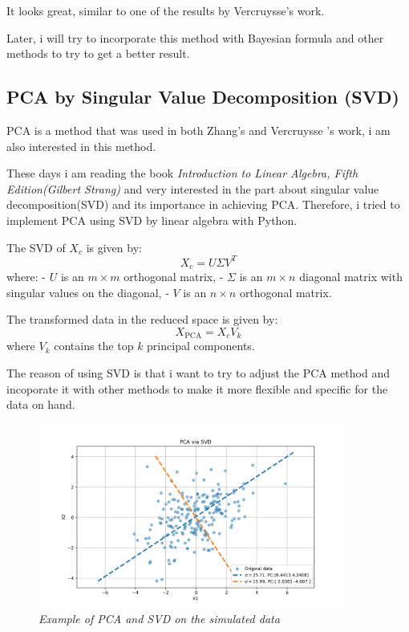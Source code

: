 \documentclass{article}
\begin{document}
It looks great, similar to one of the results by Vercruysse's work.

Later, i will try to incorporate this method with Bayesian formula and other methods to try to get a better result.


\subsection{PCA by Singular Value Decomposition (SVD)}

PCA is a method that was used in both Zhang's and Vercruysse 's work, i am also interested in this method.

These days i am reading the book \textit{Introduction to Linear Algebra, Fifth Edition(Gilbert Strang)} and very interested in the part
about singular value decomposition(SVD) and its importance in achieving PCA. Therefore, i tried to implement PCA using SVD by linear algebra 
with Python.

The SVD of \( X_c \) is given by:
\[
X_c = U \Sigma V^T
\]
where:
- \( U \) is an \( m \times m \) orthogonal matrix,
- \( \Sigma \) is an \( m \times n \) diagonal matrix with singular values on the diagonal,
- \( V \) is an \( n \times n \) orthogonal matrix.


The transformed data in the reduced space is given by:
\[
X_{\text{PCA}} = X_c V_k
\]
where \( V_k \) contains the top \( k \) principal components.

The reason of using SVD is that i want to try to adjust the PCA method and incoporate it with other methods 
to make it more flexible and specific for the data on hand.

\begin{figure}[!h]
    \centering
    \includegraphics[width=0.9\textwidth]{../src_test/results/pca_svd.png}
    \caption{\textit{Example of PCA and SVD on the simulated data}}
    \label{fig:pca_svd}
\end{figure}
\end{document}
